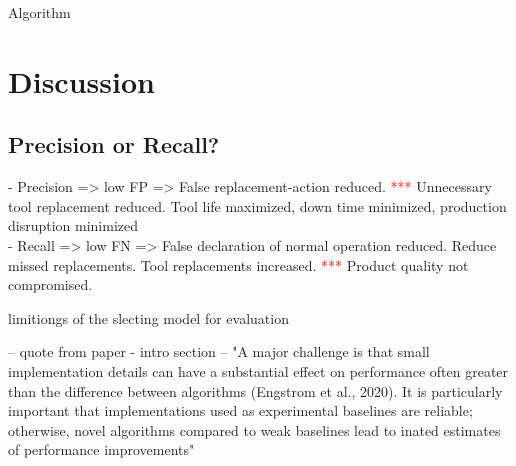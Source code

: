 \documentclass[a4paper, 12pt]{article}
\begin{document}
Algorithm
%



\section{Discussion}

\subsection{Precision or Recall?}
- Precision => low FP => False replacement-action reduced. \textcolor{red}{***} Unnecessary tool replacement reduced. Tool life maximized, down time minimized, production disruption minimized \\
- Recall => low FN => False declaration of normal operation reduced. Reduce missed replacements. Tool replacements increased. \textcolor{red}{***} Product quality not compromised. 


limitiongs of the slecting model for evaluation

\cite{SB3-paper} -- quote from paper - intro section -- "A major challenge is that small implementation details can have a substantial effect on performance often greater than the difference between algorithms (Engstrom et al., 2020). It is particularly important that  implementations used as experimental baselines are reliable; otherwise, novel algorithms compared to weak baselines lead to inated estimates of performance improvements"
\end{document}
